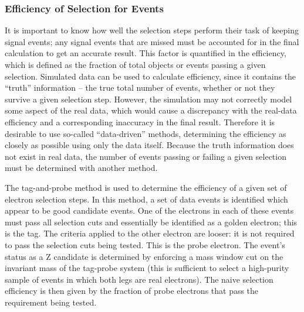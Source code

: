 
\subsubsection{Efficiency of Selection for \Zee Events}
\label{evSel:eff}

It is important to know how well the selection steps perform their task of 
keeping signal events;  
any signal events that are 
missed %
must be accounted for in the final 
calculation to get an accurate result.  
This factor is quantified in the efficiency, which is defined as 
the fraction of total objects or events passing a given selection. %
Simulated data can be used to calculate efficiency, 
since it contains the ``truth'' information -- 
the true total number of events, 
whether or not they survive a given selection step.
However, the simulation may not correctly model some 
aspect of the real data, which would cause a discrepancy 
with the real-data efficiency 
and a corresponding inaccuracy in the final result.  
Therefore it is desirable to use so-called ``data-driven''  %
methods, %
determining the efficiency as closely as possible 
using only the data itself.  
Because the truth information does not exist in real data, 
the number of events passing or failing a given selection 
must be determined with another method.  

The tag-and-probe method is used to determine the efficiency of a given set of electron selection steps.  
In this method, a set of data events is identified which appear to be good 
\Zee
candidate events.  
One of the electrons in each of these events must pass 
all selection cuts and essentially be identified as a golden electron; 
this is the tag.  
The criteria applied to the other electron are looser: 
it is not required to pass the selection cuts being tested.  
This is the probe electron.  
The event's status as a Z candidate is determined by enforcing 
a mass window cut on the invariant mass of the tag-probe system 
(this is sufficient %
to select a high-purity sample of 
events in which both legs are real electrons).
The naive selection efficiency is then given by the fraction 
of probe electrons that pass the requirement being tested.  

